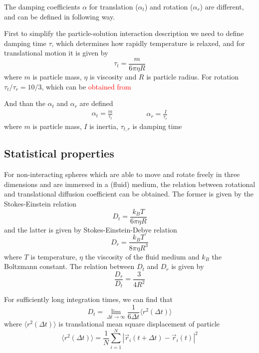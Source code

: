 The damping coefficients $\alpha$ for translation ($\alpha_t$) and rotation ($\alpha_r$) are different, and can be defined in following way.

First to simplify the particle-solution interaction description we need to define damping time $\tau$, which determines how rapidly temperature is relaxed, and for translational motion it is given by
\begin{equation}
\label{eq:Translation_damping_time}
	\tau_{t} = \frac{m}{6 \pi \eta R}
\end{equation}
where $m$ is particle mass, $\eta$ is viscosity and $R$ is particle radius. For rotation $\tau_{t} / \tau_{r} = 10/3$, which can be \textcolor{red}{obtained from}

And than the $\alpha_t$ and $\alpha_r$ are defined
\begin{equation}
	\begin{aligned}
		\alpha_t = \frac{m}{\tau_t}
	\end{aligned}
	\qquad
	\qquad
	\begin{aligned}
		\alpha_r = \frac{I}{\tau_r}
	\end{aligned}
\end{equation}
where $m$ is particle mass, $I$ is inertia, $\tau_{t,r}$ is damping time

\subsection{Statistical properties}
For non-interacting spheres which are able to move and rotate freely in three dimensions and are immersed in a (fluid) medium, the relation between rotational and translational diffusion coefficient can be obtained.
The former is given by the Stokes-Einstein relation
\begin{equation}
	D_t = \frac{k_B T}{6 \pi \eta R}
\end{equation}
and the latter is given by Stokes-Einstein-Debye relation
\begin{equation}
	D_r = \frac{k_B T}{8 \pi \eta R^3}
\end{equation}
where $T$ is temperature, $\eta$ the viscosity of the fluid medium and $k_B$ the Boltzmann constant. The relation between $D_t$ and $D_r$ is given by
\begin{equation}
	\frac{D_r}{D_t} = \frac{3}{4 R^2}
\end{equation}

For sufficiently long integration times, we can find that
\begin{equation}
\label{eq:translation_diffsion_vs_displacement}
	D_t = \lim_{\Delta t \to \infty} \frac{1}{6 \Delta t} \langle r^2(\Delta t)\rangle
\end{equation}
where $\langle r^2(\Delta t)\rangle$ is translational mean square displacement of particle
\begin{equation}
	\langle r^2(\Delta t)\rangle
	 = \frac{1}{N} \sum_{i=1}^{N} |\vec{r}_i(t + \Delta t) - \vec{r}_i(t)|^2
\end{equation}

